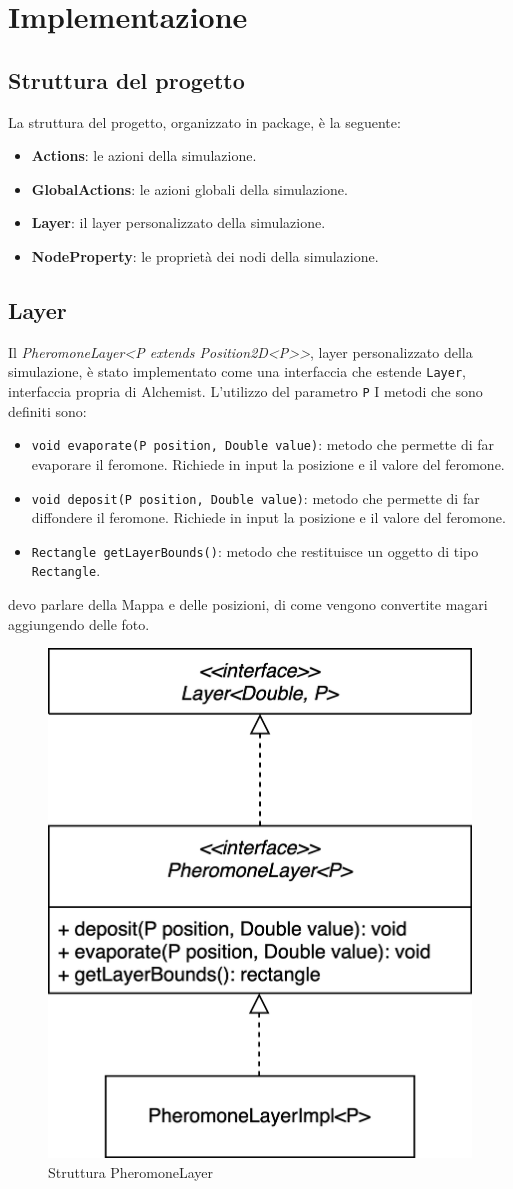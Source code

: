 \chapter{Implementazione}
\section{Struttura del progetto}
La struttura del progetto, organizzato in package, è la seguente:
\begin{itemize}
    \item \textbf{Actions}: le azioni della simulazione.
    \item \textbf{GlobalActions}: le azioni globali della simulazione.
    \item \textbf{Layer}: il layer personalizzato della simulazione.
    \item \textbf{NodeProperty}: le proprietà dei nodi della simulazione.
\end{itemize}

\section{Layer}
Il \textit{PheromoneLayer<P extends Position2D<P>>}, layer personalizzato della simulazione, è stato implementato 
come una interfaccia che estende \texttt{Layer}, 
interfaccia propria di Alchemist. L'utilizzo del parametro \texttt{P} 
I metodi che sono definiti sono:
\begin{itemize}
    \item \texttt{void evaporate(P position, Double value)}: metodo che permette di far evaporare il feromone. 
    Richiede in input la posizione e il valore del feromone.
    \item \texttt{void deposit(P position, Double value)}: metodo che permette di far diffondere il feromone.
     Richiede in input la posizione e il valore del feromone.
    \item \texttt{Rectangle getLayerBounds()}: metodo che restituisce un oggetto di tipo \texttt{Rectangle}.
\end{itemize}
devo parlare della Mappa e delle posizioni, di come vengono convertite magari aggiungendo delle foto.
\begin{figure}[ht]
    \centering
    \includegraphics[width=.5\linewidth]{figures/pheromoneLayer.png}
    \caption{Struttura PheromoneLayer}\label{fig:phLayer}
\end{figure}

